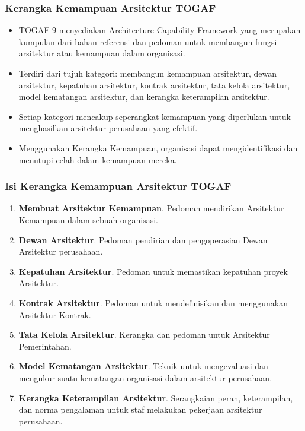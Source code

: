 \documentclass[aspectratio=169]{beamer}
\begin{document}
	\begin{frame}
		\frametitle{Kerangka Kemampuan Arsitektur TOGAF}
		\begin{itemize}
			\item TOGAF 9 menyediakan Architecture Capability Framework yang merupakan kumpulan dari bahan referensi dan pedoman untuk membangun fungsi arsitektur
			atau kemampuan dalam organisasi.
			\item Terdiri dari tujuh kategori: membangun kemampuan arsitektur, dewan arsitektur, kepatuhan arsitektur, kontrak arsitektur, tata kelola arsitektur, model kematangan arsitektur, dan kerangka keterampilan arsitektur.
			\item Setiap kategori mencakup seperangkat kemampuan yang diperlukan untuk menghasilkan arsitektur perusahaan yang efektif.
			\item Menggunakan Kerangka Kemampuan, organisasi dapat mengidentifikasi dan menutupi celah dalam kemampuan mereka.
		\end{itemize}
	\end{frame}
	
	\begin{frame}
		\frametitle{Isi Kerangka Kemampuan Arsitektur TOGAF}
		\begin{enumerate}
			\item \textbf{Membuat Arsitektur Kemampuan}. Pedoman mendirikan Arsitektur Kemampuan
			dalam sebuah organisasi.
			\item \textbf{Dewan Arsitektur}. Pedoman pendirian dan pengoperasian Dewan Arsitektur perusahaan.
			\item \textbf{Kepatuhan Arsitektur}. Pedoman untuk memastikan kepatuhan proyek Arsitektur.
			\item \textbf{Kontrak Arsitektur}. Pedoman untuk mendefinisikan dan menggunakan Arsitektur Kontrak.
			\item \textbf{Tata Kelola Arsitektur}. Kerangka dan pedoman untuk Arsitektur Pemerintahan.
			\item \textbf{Model Kematangan Arsitektur}. Teknik untuk mengevaluasi dan mengukur suatu kematangan organisasi dalam arsitektur perusahaan.
			\item \textbf{Kerangka Keterampilan Arsitektur}. Serangkaian peran, keterampilan, dan norma pengalaman untuk staf melakukan pekerjaan arsitektur perusahaan.
		\end{enumerate}
	\end{frame}
	
\end{document}
